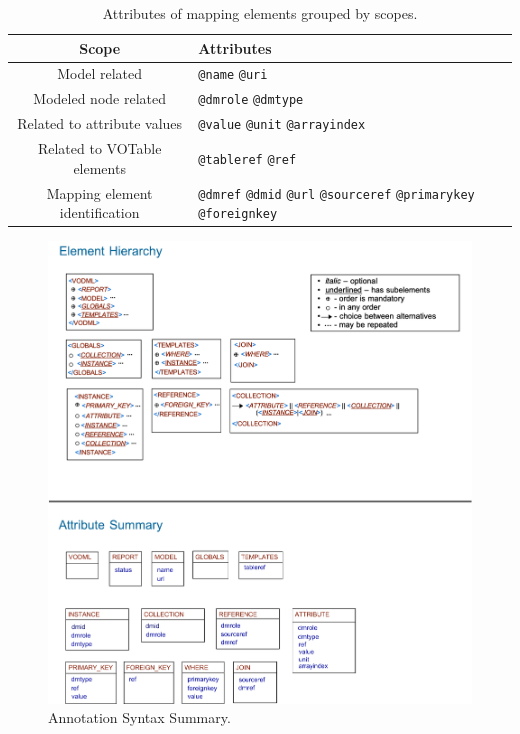 \begin{table}[!htbp]
\small
\centering
\begin{tabulary}{\linewidth}{|c|J|}       
       \hline 
            \textbf{Scope} & 
            \textbf {Attributes}\\
       \hline         
       \hline  
             Model related & 
             \texttt{@name} \texttt{@uri} \\
       \hline  
             Modeled node related & 
             \texttt{@dmrole} \texttt{@dmtype} \\
       \hline  
             Related to attribute values & 
             \texttt{@value} \texttt{@unit} \texttt{@arrayindex} \\
       \hline  
             Related to VOTable elements & 
             \texttt{@tableref} \texttt{@ref} \\
       \hline  
             Mapping element identification& 
             \texttt{@dmref} \texttt{@dmid} \texttt{@url} \texttt{@sourceref} \texttt{@primarykey} \texttt{@foreignkey} \\
       \hline
     \end{tabulary}
     \caption{Attributes of mapping elements grouped by scopes.} 
     \label{tbl:syntax-att}
 \end{table}
 
 


  \begin{figure}[h]
    \begin{center}
      \includegraphics[width=1.2\textwidth]{mivot-summary.png}
      \caption{Annotation Syntax Summary.}
      \label{fig:summary}
    \end{center}
  \end{figure}


